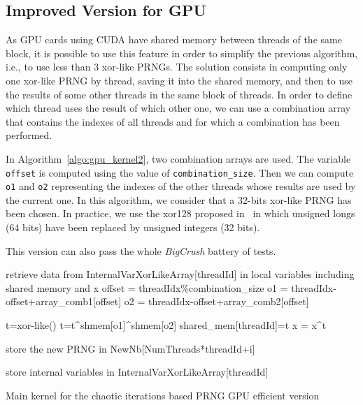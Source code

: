 \documentclass{article}
\begin{document}
\subsection{Improved Version for GPU}

As GPU cards using CUDA have shared memory between threads of the same block, it
is possible  to use this  feature in order  to simplify the  previous algorithm,
i.e., to use less  than 3 xor-like PRNGs. The solution  consists in computing only
one xor-like PRNG by thread, saving  it into the shared memory, and then to use the results
of some  other threads in the  same block of  threads. In order to  define which
thread uses the result of which other  one, we can use a combination array that
contains  the indexes  of  all threads  and  for which  a combination has  been
performed. 

In  Algorithm~\ref{algo:gpu_kernel2},  two  combination  arrays are  used.   The
variable     \texttt{offset}    is     computed    using     the     value    of
\texttt{combination\_size}.   Then we  can compute  \texttt{o1}  and \texttt{o2}
representing the  indexes of  the other  threads whose results  are used  by the
current one.   In this algorithm, we  consider that a 32-bits  xor-like PRNG has
been chosen. In practice, we  use the xor128 proposed in~\cite{Marsaglia2003} in
which  unsigned longs  (64 bits)  have been  replaced by  unsigned  integers (32
bits).

This version  can also pass the whole {\it BigCrush} battery of tests.

\begin{algorithm}


 {
  retrieve data from InternalVarXorLikeArray[threadId] in local variables including shared memory and x\;
  offset = threadIdx\%combination\_size\;
  o1 = threadIdx-offset+array\_comb1[offset]\;
  o2 = threadIdx-offset+array\_comb2[offset]\;
   {
    t=xor-like()\;
    t=t\textasciicircum shmem[o1]\textasciicircum shmem[o2]\;
    shared\_mem[threadId]=t\;
    x = x\textasciicircum t\;

    store the new PRNG in NewNb[NumThreads*threadId+i]\;
  }
  store internal variables in InternalVarXorLikeArray[threadId]\;
}

\caption{Main kernel for the chaotic iterations based PRNG GPU efficient
version\label{IR}}
\label{algo:gpu_kernel2} 
\end{algorithm}
\end{document}
